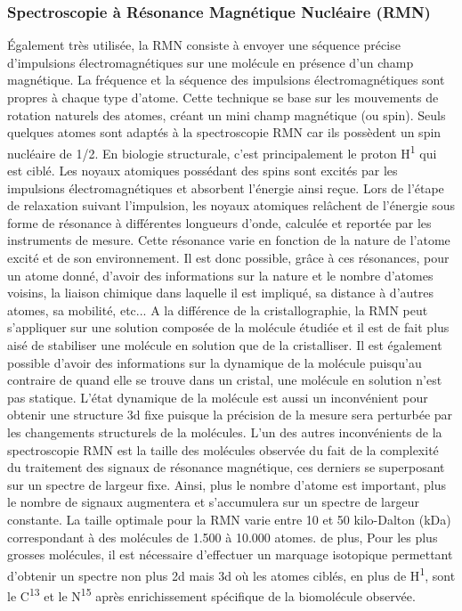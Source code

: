 \subsubsection{Spectroscopie à Résonance Magnétique Nucléaire (RMN)}

Également très utilisée, la RMN consiste à envoyer une séquence précise d'impulsions électromagnétiques sur une molécule en présence d'un champ magnétique. La fréquence et la séquence des impulsions électromagnétiques sont propres à chaque type d'atome. Cette technique se base sur les mouvements de rotation naturels des atomes, créant un mini champ magnétique (ou spin). Seuls quelques atomes sont adaptés à la spectroscopie RMN car ils possèdent un spin nucléaire de 1/2. En biologie structurale, c'est principalement le proton H\textsuperscript{1} qui est ciblé. Les noyaux atomiques possédant des spins sont excités par les impulsions électromagnétiques et absorbent l'énergie ainsi reçue. Lors de l'étape de relaxation suivant l'impulsion, les noyaux atomiques relâchent de l'énergie sous forme de résonance à différentes longueurs d'onde, calculée et reportée par les instruments de mesure. Cette résonance varie en fonction de la nature de l'atome excité et de son environnement. Il est donc possible, grâce à ces résonances, pour un atome donné, d'avoir des informations sur la nature et le nombre d'atomes voisins, la liaison chimique dans laquelle il est impliqué, sa distance à d'autres atomes, sa mobilité, etc... A la différence de la cristallographie, la RMN peut s'appliquer sur une solution composée de la molécule étudiée et il est de fait plus aisé de stabiliser une molécule en solution que de la cristalliser. Il est également possible d'avoir des informations sur la dynamique de la molécule puisqu'au contraire de quand elle se trouve dans un cristal, une molécule en solution n'est pas statique.
L'état dynamique de la molécule est aussi un inconvénient pour obtenir une structure 3d fixe puisque la précision de la mesure sera perturbée par les changements structurels de la molécules. L'un des autres inconvénients de la spectroscopie RMN est la taille des molécules observée du fait de la complexité du traitement des signaux de résonance magnétique, ces derniers se superposant sur un spectre de largeur fixe. Ainsi, plus le nombre d'atome est important, plus le nombre de signaux augmentera et s'accumulera sur un spectre de largeur constante. La taille optimale pour la RMN varie entre 10 et 50 kilo-Dalton (kDa) correspondant à des molécules de 1.500 à 10.000 atomes. de plus, Pour les plus grosses molécules, il est nécessaire d'effectuer un marquage isotopique permettant d'obtenir un spectre non plus 2d mais 3d où les atomes ciblés, en plus de H\textsuperscript{1}, sont le C\textsuperscript{13} et le N\textsuperscript{15} après enrichissement spécifique de la biomolécule observée.

